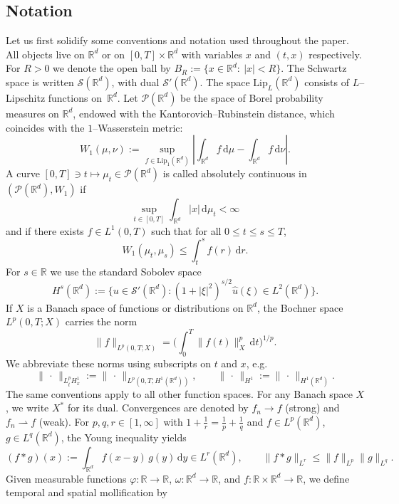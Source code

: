 \documentclass[reqno, 11pt]{amsart}
\numberwithin{equation}{section}
\theoremstyle{definition}
\begin{document}
\subsection{Notation}

Let us first solidify some conventions and notation used throughout the paper. All objects live on $\mathbb{R}^d$ or on $[0,T]\times\mathbb{R}^d$ with variables $x$ and $(t,x)$ respectively. For $R>0$ we denote the open ball by $B_R:=\{x\in\mathbb{R}^d:\ |x|<R\}$. The Schwartz space is written $\mathcal{S}(\mathbb{R}^d)$, with dual $\mathcal{S}'(\mathbb{R}^d)$. The space $\mathrm{Lip}_L(\mathbb{R}^d)$ consists of $L$--Lipschitz functions on~$\mathbb{R}^d$. Let $\mathscr{P}(\mathbb{R}^{d})$ be the space of Borel probability measures on $\mathbb{R}^d$, endowed with the Kantorovich–Rubinstein distance, which coincides with the $1$–Wasserstein metric:
\[
W_1(\mu,\nu)
:=\sup_{f\in\mathrm{Lip}_1(\mathbb{R}^d)}
\left|\int_{\mathbb{R}^d} f\,\mathrm{d} \mu-\int_{\mathbb{R}^d} f\,\mathrm{d} \nu\right|.
\]
A curve $[0,T]\ni t\mapsto \mu_t\in\mathscr{P}(\mathbb{R}^{d})$ is called absolutely continuous in $(\mathscr{P}(\mathbb{R}^{d}),W_1)$ if
\[
\sup_{t\in[0,T]}\int_{\mathbb{R}^d} |x| \,\mathrm{d}\mu_t < \infty
\]
and if there exists $f\in L^1(0,T)$ such that for all $0\le t\le s\le T$,
\[
W_1(\mu_t,\mu_s)\le \int_t^s f(r)\,\mathrm{d} r.
\]
For $s\in\mathbb{R}$ we use the standard Sobolev space
\[
H^s(\mathbb{R}^d):=\{u\in\mathcal{S}'(\mathbb{R}^d): (1+|\xi|^2)^{s/2}\widehat{u}(\xi)\in L^2(\mathbb{R}^d)\}.
\]
If $X$ is a Banach space of functions or distributions on $\mathbb{R}^d$, the Bochner space $L^p(0,T;X)$ carries the norm
\[
\|f\|_{L^p(0,T;X)}=\Big(\int_0^T \|f(t)\|_X^p\,\mathrm{d} t\Big)^{1/p}.
\]
We abbreviate these norms using subscripts on $t$ and $x$, e.g.
\[
\|\,\cdot\,\|_{L_t^p H_x^1}
:=\|\,\cdot\,\|_{L^p(0,T;H^1(\mathbb{R}^d))},
\qquad
\|\,\cdot\,\|_{H^1}:=\|\,\cdot\,\|_{H^1(\mathbb{R}^d)}.
\]
The same conventions apply to all other function spaces.
For any Banach space $X$, we write $X^\ast$ for its dual.
Convergences are denoted by $f_n\to f$ (strong) and $f_n\rightharpoonup f$ (weak). For $p,q,r\in[1,\infty]$ with $1+\tfrac1r=\tfrac1p+\tfrac1q$ and $f\in L^p(\mathbb{R}^d)$, $g\in L^q(\mathbb{R}^d)$, the Young inequality yields
\[
(f\ast g)(x) := \int_{\mathbb{R}^d} f(x-y)\,g(y)\,\mathrm{d} y \in L^r(\mathbb{R}^d),
\qquad
\|f\ast g\|_{L^r}\le \|f\|_{L^p}\|g\|_{L^q}.
\]
Given measurable functions $\varphi:\mathbb{R}\to\mathbb{R}$, $\omega:\mathbb{R}^d\to\mathbb{R}$, and $f:\mathbb{R}\times \mathbb{R}^d\to\mathbb{R}$, we define temporal and spatial mollification by
\end{document}
